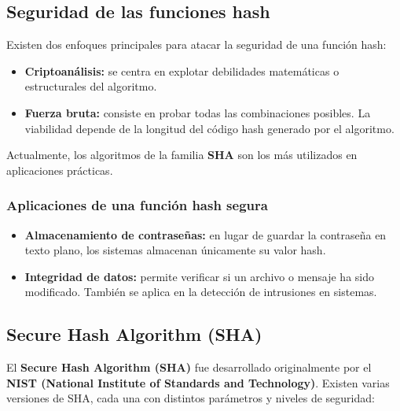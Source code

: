 \documentclass[11pt,a4paper]{article}
\begin{document}
\subsection{Seguridad de las funciones hash}

Existen dos enfoques principales para atacar la seguridad de una función hash:

\begin{itemize}
    \item \textbf{Criptoanálisis:} se centra en explotar debilidades matemáticas o estructurales del algoritmo.
    \item \textbf{Fuerza bruta:} consiste en probar todas las combinaciones posibles. La viabilidad depende de la longitud del código hash generado por el algoritmo.
\end{itemize}

Actualmente, los algoritmos de la familia \textbf{SHA} son los más utilizados en aplicaciones prácticas.

\subsubsection*{Aplicaciones de una función hash segura}

\begin{itemize}
    \item \textbf{Almacenamiento de contraseñas:} en lugar de guardar la contraseña en texto plano, los sistemas almacenan únicamente su valor hash.
    \item \textbf{Integridad de datos:} permite verificar si un archivo o mensaje ha sido modificado. También se aplica en la detección de intrusiones en sistemas.
\end{itemize}

\subsection{Secure Hash Algorithm (SHA)}

El \textbf{Secure Hash Algorithm (SHA)} fue desarrollado originalmente por el \textbf{NIST (National Institute of Standards and Technology)}.
Existen varias versiones de SHA, cada una con distintos parámetros y niveles de seguridad:
\end{document}
